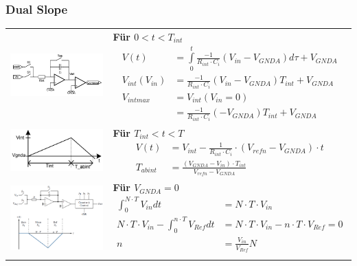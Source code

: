 \subsubsection{Dual Slope }
\begin{longtable}{cp{12cm}}
 \includegraphics[width=6cm, valign=t]{pictures/dualSlope11}
 & 
 \textbf{Für $0<t<T_{int}$}
 \vspace{0.2cm}
 {\begin{align*}
      V(t)&=
      \int\limits_0^{t}\frac{-1}{R_{int}
      \cdot C_{i}}(V_{in}-V_{GNDA})d\tau+V_{GNDA}\\
      V_{int}(V_{in})&=\frac{-1}{R_{int}
      \cdot C_{i}}(V_{in}-V_{GNDA})T_{int}+V_{GNDA}\\
      V_{intmax}&=V_{int}(V_{in}=0)\\
                &=\frac{-1}{R_{int}
      \cdot C_{i}}(-V_{GNDA})T_{int}+V_{GNDA}
 \end{align*}} \\
 
 \includegraphics[width=6cm, valign=t]{pictures/dualSlope12}
 &  
 \textbf{Für $T_{int}<t<T$}
 \vspace{0.2cm}
 {\begin{align*}
  V(t)&=V_{int}-\frac{1}{R_{int}\cdot C_{i}}\cdot
  (V_{refn}-V_{GNDA}) \cdot t\\
   T_{abint}&=\frac{(V_{GNDA}-V_{in}) \cdot T_{int}}{V_{refn}-V_{GNDA}}
 \end{align*}}\\
 
 \includegraphics[width=6cm, valign=t]{pictures/dualSlope2}
 &  
 \textbf{Für $V_{GNDA}=0$}
 \vspace{0.2cm}
 {\begin{align*}
    \int^{N\cdot T}_{0}V_{in}dt&=N \cdot T \cdot V_{in}\\
      N \cdot T \cdot V_{in}-\int^{n \cdot T}_{0}V_{Ref}dt&=N \cdot T \cdot V_{in}-n \cdot T \cdot V_{Ref}=0\\
      n&=\frac{V_{in}}{V_{Ref}}N\\
  \end{align*}}\\
  

\end{longtable}
